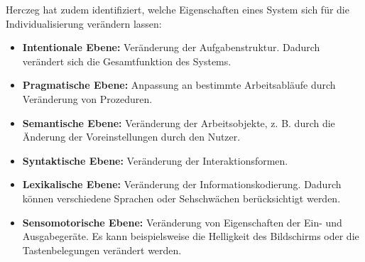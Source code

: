 
Herczeg \cite{Herczeg2006} hat zudem identifiziert, welche Eigenschaften eines System sich für die Individualisierung verändern lassen:
\begin{itemize}
\item \textbf{Intentionale Ebene:} Veränderung der Aufgabenstruktur. Dadurch verändert sich die Gesamtfunktion des Systems.
\item \textbf{Pragmatische Ebene:} Anpassung an bestimmte Arbeitsabläufe durch Veränderung von Prozeduren.
\item \textbf{Semantische Ebene:} Veränderung der Arbeitsobjekte, z. B. durch die Änderung der Voreinstellungen durch den Nutzer.
\item \textbf{Syntaktische Ebene:} Veränderung der Interaktionsformen.
\item \textbf{Lexikalische Ebene:} Veränderung der Informationskodierung. Dadurch können verschiedene Sprachen oder Sehschwächen berücksichtigt werden.
\item \textbf{Sensomotorische Ebene:} Veränderung von Eigenschaften der Ein- und Ausgabegeräte. Es kann beispielsweise die Helligkeit des Bildschirms oder die Tastenbelegungen verändert werden.
\end{itemize}

